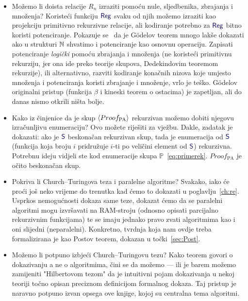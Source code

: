 \begin{itemize}
    \item Možemo li doista relacije $R_n$ izraziti pomoću nule, sljedbenika, zbrajanja i mno\-že\-nja? Koristeći funkciju $\f{Reg}$ svaku od njih možemo izraziti kao projekciju primitivno rekurzivne relacije, ali kodiranje potrebno za $\f{Reg}$ bitno koristi potenciranje. Pokazuje se~\cite{smullyan} da je Gödelov teorem mnogo lakše dokazati ako u strukturi ${\mathbb N}$ shvatimo i potenciranje kao osnovnu operaciju. Zapisati potenciranje \emph{logički} pomoću zbrajanja i množenja (ne koristeći primitivnu rekurziju, jer ona ide preko teorije skupova, Dedekindovim teoremom rekurzije), ili alternativno, razviti kodiranje konačnih nizova koje umjesto množenja i potenciranja koristi zbrajanje i množenje, vrlo je teško. Gödelov originalni pristup (funkcija $\beta$ i kineski teorem o ostacima) je zapetljan, ali do danas nismo otkrili ništa bolje. %
    \item Kako iz činjenice da je skup $\langle Proof_{\text{PA}}\rangle$ rekurzivan možemo dobiti njegovu iz\-ra\-čun\-lji\-vu enumeraciju? Ovo možete riješiti za vježbu. Dakle, zadatak je dokazati: ako je $\f S$ beskonačan rekurzivan skup, tada je enumeracija od $\f S$ (funkcija koja broju $i$ pridružuje $i$-ti po veličini element od $\f S$) rekurzivna. Potrebnu ideju vidjeli ste kod enumeracije skupa $\mathbb P$~\eqref{eq:primerek}. $Proof_{\text{PA}}$ je očito beskonačan skup.
    \item Pokriva li Church--\!Turingova teza i paralelne algoritme? Svakako, iako će proći još neko vrijeme do trenutka kad ćemo to dokazati u poglavlju~\ref{ch:re}. Usprkos nemogućnosti dokaza same teze, dokazat ćemo da se paralelni algoritmi mogu izvršavati na RAM-stroju (odnosno opisati parcijalno rekurzivnim funkcijama) te se imaju jednako pravo zvati algoritmima kao i oni slijedni (neparalelni). Konkretno, tvrdnja koja nam ovdje treba formalizirana je kao Postov teorem, dokazan u točki~\ref{sec:Post}.
    \item Možemo li potpuno izbjeći Church--\!Turingovu tezu? Kako teorem govori o dokazivanju a ne o algoritmima, čini se da možemo --- ili je barem možemo zamijeniti "Hilbertovom tezom" da je intuitivni pojam dokazivanja u nekoj teoriji točno opisan preciznom definicijom formalnog dokaza. Taj pristup je naravno potpuno izvan opsega ove knjige, kojoj su centralna tema algoritmi.

\end{itemize}
